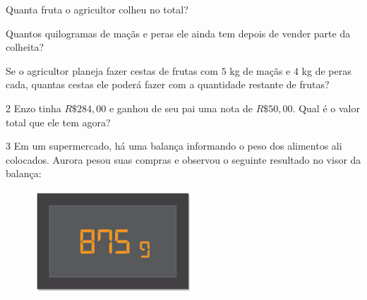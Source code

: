 \begin{escolha}
\item Quanta fruta o agricultor colheu no total?

\begin{emptybox}



\end{emptybox}

\item Quantos quilogramas de maçãs e peras ele ainda tem depois de vender parte da colheita?

\begin{emptybox}



\end{emptybox}

\item Se o agricultor planeja fazer cestas de frutas com $5$ kg de maçãs e $4$ kg de peras cada,
quantas cestas ele poderá fazer com a quantidade restante de frutas?

\begin{emptybox}





\end{emptybox}
\end{escolha}

\num{2}  Enzo tinha $R\$284,00$ e ganhou de seu pai uma nota de $R\$50,00$. Qual é
o valor total que ele tem agora?


\pagebreak
\num{3}  Em um supermercado, há uma balança informando o peso dos alimentos
ali colocados. Aurora pesou suas compras e observou o seguinte resultado
no visor da balança:

\begin{figure}[htpb!]
\centering\includegraphics[width=.7\textwidth]{./imgSAEB_6_MAT/media/image23.png}
\end{figure}


